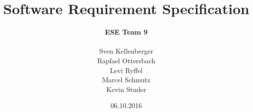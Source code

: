\title{Software Requirement Specification}
\date{06.10.2016}
\author{\textbf{ESE Team 9} \\ \\Sven Kellenberger\\Rapfael
Ottersbach\\Levi Ryffel\\Marcel Schmutz\\Kevin Studer}
